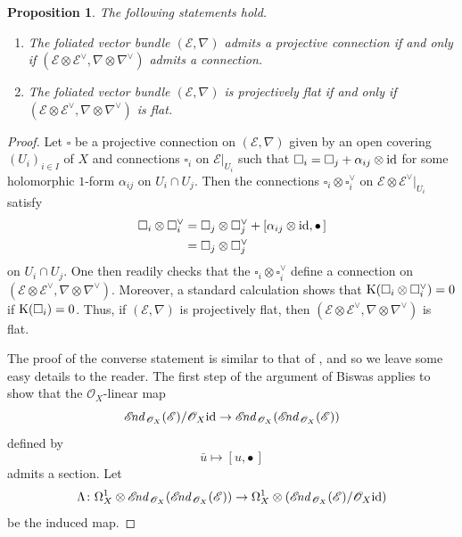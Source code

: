 \documentclass[english,10pt]{amsart}
\newcommand{\sE}{\mathscr{E}}
\newcommand{\sO}{\mathscr{O}}
\newtheorem{prop}[thm]{Proposition}
\theoremstyle{definition}
\theoremstyle{remark}
\numberwithin{equation}{section}
\begin{document}
\begin{prop}\label{prop:projectively_flat_versus_flat}
The following statements hold. 
\begin{enumerate}
\item The foliated vector bundle $(\sE,\nabla)$ admits a projective connection if and only if $(\sE\otimes\sE^\vee,\nabla\otimes\nabla^\vee)$ admits a connection.
\item The foliated vector bundle $(\sE,\nabla)$ is projectively flat if and only if $(\sE\otimes\sE^\vee,\nabla\otimes\nabla^\vee)$ is flat.
\end{enumerate}
\end{prop}

\begin{proof}
Let $\square$ be a projective connection on $(\sE,\nabla)$ given by an open covering $(U_i)_{i\in I}$ of $X$ and connections $\square_i$ on $\sE|_{U_i}$ such that $\square_i=\square_j+\alpha_{ij}\otimes \textup{id}$ for some holomorphic $1$-form $\alpha_{ij}$ on $U_i\cap U_j$. Then the connections 
$\square_i \otimes \square^\vee_i$ on $\sE\otimes\sE^\vee|_{U_i}$ satisfy
\begin{align*}
\square_i \otimes \square^\vee_i & = \square_j \otimes \square^\vee_j + [\alpha_{ij}\otimes \textup{id}, \bullet\, ] \\
& =  \square_j \otimes \square^\vee_j 
\end{align*}
on $U_i \cap U_j$. One then readily checks that the $\square_i \otimes \square^\vee_i$ define a connection on $(\sE\otimes\sE^\vee,\nabla\otimes\nabla^\vee)$. Moreover, a standard calculation shows that $\textup{K}(\square_i \otimes \square^\vee_i) = 0$ if $\textup{K}(\square_i)=0$. Thus, if $(\sE,\nabla)$ is projectively flat, then $(\sE\otimes\sE^\vee,\nabla\otimes\nabla^\vee)$ is flat.

The proof of the converse statement is similar to that of \cite[Proposition 1.2]{biswas_semistability}, and so we leave some easy details to the reader. The first step of the argument of Biswas applies to show that the $\sO_X$-linear map
\[
\sE\hspace{-0.07cm}\textit{nd}_{\,\sO_X}(\sE)/ \sO_X\textup{id} \to  \sE\hspace{-0.07cm}\textit{nd}_{\,\sO_X}(\sE\hspace{-0.07cm}\textit{nd}_{\,\sO_X}(\sE))  
\]
defined by 
\[
\bar{u} \mapsto [u,\bullet\,]
\]
admits a section. Let 
\[
\Lambda \colon \Omega_X^1 \otimes \sE\hspace{-0.07cm}\textit{nd}_{\,\sO_X}(\sE\hspace{-0.07cm}\textit{nd}_{\,\sO_X}(\sE)) \to \Omega_X^1 \otimes (\sE\hspace{-0.07cm}\textit{nd}_{\,\sO_X}(\sE)/ \sO_X\textup{id})
\]
be the induced map. 


\end{proof}
\end{document}
